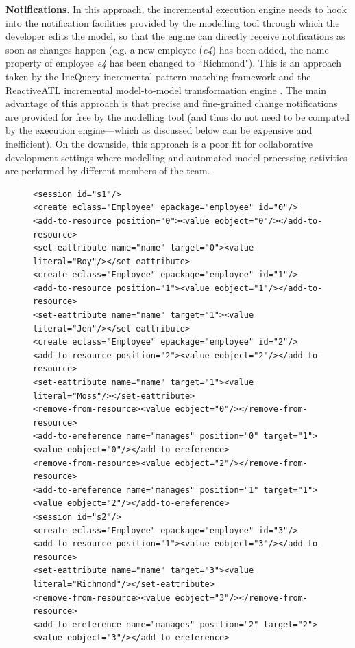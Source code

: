 \documentclass[conference]{IEEEtran}
\begin{document}
\textbf{Notifications}. In this approach, the incremental execution engine needs to hook into the notification facilities provided by the modelling tool through which the developer edits the model, so that the engine can directly receive notifications as soon as changes happen (e.g. a new employee (\emph{e4}) has been added, the name property of employee \emph{e4} has been changed to ``Richmond"). This is an approach taken by the IncQuery incremental pattern matching framework \cite{rath2012derived} and the ReactiveATL incremental model-to-model transformation engine \cite{ogunyomi2015property}. The main advantage of this approach is that precise and fine-grained change notifications are provided for free by the modelling tool (and thus do not need to be computed by the execution engine---which as discussed below can be expensive and inefficient). On the downside, this approach is a poor fit for collaborative development settings where modelling and automated model processing activities are performed by different members of the team.

\begin{figure}[h]
\begin{lstlisting}[style=xml,caption={Change-based representation of the model of Figure \ref{fig:modified_chart}.},label=lst:cbpmodel]
<session id="s1"/>
<create eclass="Employee" epackage="employee" id="0"/>
<add-to-resource position="0"><value eobject="0"/></add-to-resource>
<set-eattribute name="name" target="0"><value literal="Roy"/></set-eattribute>
<create eclass="Employee" epackage="employee" id="1"/>
<add-to-resource position="1"><value eobject="1"/></add-to-resource>
<set-eattribute name="name" target="1"><value literal="Jen"/></set-eattribute>
<create eclass="Employee" epackage="employee" id="2"/>
<add-to-resource position="2"><value eobject="2"/></add-to-resource>
<set-eattribute name="name" target="1"><value literal="Moss"/></set-eattribute>
<remove-from-resource><value eobject="0"/></remove-from-resource>
<add-to-ereference name="manages" position="0" target="1"><value eobject="0"/></add-to-ereference>
<remove-from-resource><value eobject="2"/></remove-from-resource>
<add-to-ereference name="manages" position="1" target="1"><value eobject="2"/></add-to-ereference>
<session id="s2"/>
<create eclass="Employee" epackage="employee" id="3"/>
<add-to-resource position="1"><value eobject="3"/></add-to-resource>
<set-eattribute name="name" target="3"><value literal="Richmond"/></set-eattribute>
<remove-from-resource><value eobject="3"/></remove-from-resource>
<add-to-ereference name="manages" position="2" target="2"><value eobject="3"/></add-to-ereference>
\end{lstlisting}
\end{figure}
\end{document}
